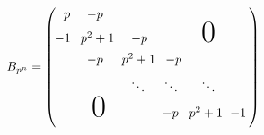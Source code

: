 \documentclass[a4paper,11pt]{amsart}
\begin{document}
 \begin{equation}
 B_{p^n}=
\begin{pmatrix}
\hspace{6pt}p &\hspace*{-6pt}-p &  %
& &  & \\
\vspace{5pt}\hspace*{-1pt}-1 & \hspace*{-2pt}p^2+1 &\hspace*{-3pt}-p %
& &\textnormal{\Huge 0} & \\
\vspace{5pt}&\hspace*{-6pt}-p & \hspace*{-4pt}p^2+1 &\hspace*{-2pt}-p 
 &  &  \\
 &  &\hspace*{-5pt}\ddots %
 &\hspace*{-6pt}\ddots & \ddots & \\%
\vspace{5pt}\hspace{2pt} &\textnormal{\Huge 0}  &  %
 &\hspace*{-7pt}-p & \hspace*{-4pt}p^2+1 &\hspace*{-4pt}-1\hspace{2pt}\\

\end{pmatrix}
\end{equation}
\end{document}
